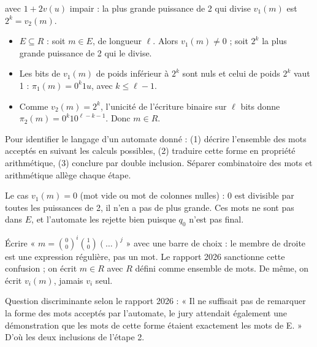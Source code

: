 \documentclass[11pt,a4paper]{article}
\providecommand{\tightlist}{\setlength{\itemsep}{0pt}\setlength{\parskip}{0pt}}
\newcommand{\equationajustee}[1]{%
  \sbox{\boiteequation}{$\displaystyle #1$}%
  \ifdim\wd\boiteequation>\linewidth
    \[\resizebox{\linewidth}{!}{\usebox{\boiteequation}}\]%
  \else
    \[#1\]%
  \fi}
\begin{document}
avec \(1+2v(u)\) impair : la plus grande puissance de 2 qui divise \(v_1(m)\) est \(2^k=v_2(m)\).

\begin{itemize}
\tightlist
\item
  \(E\subseteq R\) : soit \(m\in E\), de longueur \(\ell\). Alors \(v_1(m)\ne0\) ; soit \(2^k\) la plus grande puissance de 2 qui le divise.
\item
  Les bits de \(v_1(m)\) de poids inférieur à \(2^k\) sont nuls et celui de poids \(2^k\) vaut 1 : \(\pi_1(m)=0^k1u\), avec \(k\le\ell-1\).
\item
  Comme \(v_2(m)=2^k\), l'unicité de l'écriture binaire sur \(\ell\) bits donne \(\pi_2(m)=0^k10^{\ell-k-1}\). Donc \(m\in R\).
\end{itemize}

\equationajustee{\boxed{\mathcal{L}({\mathcal{A}}_1)=E}}

\begin{methode}

Pour identifier le langage d'un automate donné : (1) décrire l'ensemble des mots acceptés en suivant les calculs possibles, (2) traduire cette forme en propriété arithmétique, (3) conclure par double inclusion. Séparer combinatoire des mots et arithmétique allège chaque étape.

\end{methode}

\begin{piege}

Le cas \(v_1(m)=0\) (mot vide ou mot de colonnes nulles) : \(0\) est divisible par toutes les puissances de 2, il n'en a pas de plus grande. Ces mots ne sont pas dans \(E\), et l'automate les rejette bien puisque \(q_0\) n'est pas final.

\end{piege}

\begin{piege}

Écrire « \(m=\binom00^i\binom10(\ldots)^j\) » avec une barre de choix : le membre de droite est une expression régulière, pas un mot. Le rapport 2026 sanctionne cette confusion ; on écrit \(m\in R\) avec \(R\) défini comme ensemble de mots. De même, on écrit \(v_i(m)\), jamais \(v_i\) seul.

\end{piege}

\begin{jury}

Question discriminante selon le rapport 2026 : « Il ne suffisait pas de remarquer la forme des mots acceptés par l'automate, le jury attendait également une démonstration que les mots de cette forme étaient exactement les mots de E. » D'où les deux inclusions de l'étape 2.

\end{jury}
\end{document}
